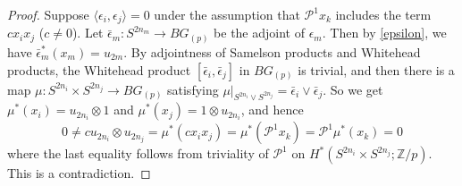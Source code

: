 \documentclass[12pt]{amsart}
\numberwithin{equation}{section}
\theoremstyle{definition}
\theoremstyle{remark}
\begin{document}
\begin{proof}
Suppose $\langle\epsilon_i,\epsilon_j\rangle=0$ under the assumption that $\mathcal{P}^1x_k$ includes the term $cx_ix_j$ ($c\ne 0$). Let $\bar{\epsilon}_m:S^{2n_m}\to BG_{(p)}$ be the adjoint of $\epsilon_m$. Then by \eqref{epsilon}, we have $\bar{\epsilon}_m^*(x_m)=u_{2m}$. By adjointness of Samelson products and Whitehead products, the Whitehead product $[\bar{\epsilon}_i,\bar{\epsilon}_j]$ in $BG_{(p)}$ is trivial, and then there is a map $\mu:S^{2n_i}\times S^{2n_j}\to BG_{(p)}$ satisfying $\mu\vert_{S^{2n_i}\vee S^{2n_j}}=\bar{\epsilon}_i\vee\bar{\epsilon}_j$. So we get $\mu^*(x_i)=u_{2n_i}\otimes 1$ and $\mu^*(x_j)=1\otimes u_{2n_i}$, and hence 
$$0\ne cu_{2n_i}\otimes u_{2n_j}=\mu^*(cx_ix_j)=\mu^*(\mathcal{P}^1x_k)=\mathcal{P}^1\mu^*(x_k)=0$$
where the last equality follows from triviality of $\mathcal{P}^1$ on $H^*(S^{2n_i}\times S^{2n_j};{\mathbb{Z}}/p)$. This is a contradiction.
\end{proof}
\end{document}
